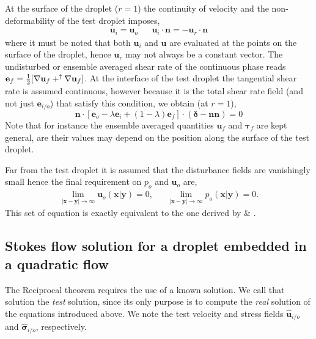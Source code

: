 At the surface of the droplet ($r = 1$) the continuity of velocity and the non-deformability of the test droplet imposes, 
\begin{align}
    \textbf{u}_{i} = \textbf{u}_{o}
    && 
    \textbf{u}_{i} \cdot \textbf{n}
    =
    - \textbf{u}_r \cdot \textbf{n}
    \label{eq:normal_vel}
\end{align}
where it must be noted that both $\textbf{u}_{i}$ and $\textbf{u}$ are evaluated at the points on the surface of the droplet, hence $\textbf{u}_r$ may not always be a constant vector. 
The undisturbed or ensemble averaged shear rate of the continuous phase reads  $\textbf{e}_f =\frac{1}{2} [\mathbf{\nabla} \textbf{u}_f + ^\dagger \mathbf{\nabla} \textbf{u}_f]$. 
At the interface of the test droplet the tangential shear rate is assumed continuous, however because it is the total shear rate field (and not just $\textbf{e}_{i/o}$) that satisfy this condition, we obtain (at $r=1$),
\begin{equation}
    \mathbf{n}\cdot [\textbf{e}_{o} - \lambda \textbf{e}_{i} + (1-\lambda)\textbf{e}_f]\cdot (\bm\delta - \textbf{nn})
    =
    0
    \label{eq:boundary_cdt_stress}
\end{equation}
Note that for instance the ensemble averaged quantities $\textbf{u}_f$ and $\bm\tau_f$ are kept general, are their values may depend on the position along the surface of the test droplet. 


Far from the test droplet it is assumed that the disturbance fields are vanishingly small hence the final requirement on $p_{o}$ and $\textbf{u}_{o}$ are, 
\begin{align*}
    \lim_{|\textbf{x}-\textbf{y}|\to\infty }\textbf{u}_{o}(\textbf{x}|\textbf{y}) = 0,
    && \lim_{|\textbf{x}-\textbf{y}|\to\infty }p_{o}(\textbf{x}|\textbf{y})= 0. 
\end{align*}
This set of equation is exactly equivalent to the one derived by \cite{maxey1983equation} \& \citet{gatignol1983faxen}. 






\subsection{Stokes flow solution for a droplet embedded in a quadratic flow}
The Reciprocal theorem requires the use of a known solution.
We call that solution the \textit{test} solution, since its only purpose is to compute the \textit{real} solution of the equations introduced above. 
We note the test velocity and stress fields $\hat{\textbf{u}}_{i/o}$ and $\hat{\bm\sigma}_{i/o}$, respectively. 

